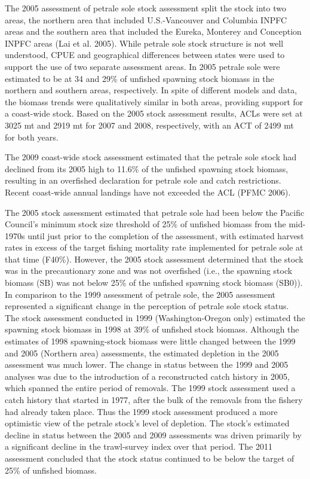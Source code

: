 \documentclass[12pt,]{article}
\begin{document}
The 2005 assessment of petrale sole stock assessment split the stock
into two areas, the northern area that included U.S.-Vancouver and
Columbia INPFC areas and the southern area that included the Eureka,
Monterey and Conception INPFC areas (Lai et al. 2005). While petrale
sole stock structure is not well understood, CPUE and geographical
differences between states were used to support the use of two separate
assessment areas. In 2005 petrale sole were estimated to be at 34 and
29\% of unfished spawning stock biomass in the northern and southern
areas, respectively. In spite of different models and data, the biomass
trends were qualitatively similar in both areas, providing support for a
coast-wide stock. Based on the 2005 stock assessment results, ACLs were
set at 3025 mt and 2919 mt for 2007 and 2008, respectively, with an ACT
of 2499 mt for both years.

The 2009 coast-wide stock assessment estimated that the petrale sole
stock had declined from its 2005 high to 11.6\% of the unfished spawning
stock biomass, resulting in an overfished declaration for petrale sole
and catch restrictions. Recent coast-wide annual landings have not
exceeded the ACL (PFMC 2006).

The 2005 stock assessment estimated that petrale sole had been below the
Pacific Council's minimum stock size threshold of 25\% of unfished
biomass from the mid-1970s until just prior to the completion of the
assessment, with estimated harvest rates in excess of the target fishing
mortality rate implemented for petrale sole at that time (F40\%).
However, the 2005 stock assessment determined that the stock was in the
precautionary zone and was not overfished (i.e., the spawning stock
biomass (SB) was not below 25\% of the unfished spawning stock biomass
(SB0)). In comparison to the 1999 assessment of petrale sole, the 2005
assessment represented a significant change in the perception of petrale
sole stock status. The stock assessment conducted in 1999
(Washington-Oregon only) estimated the spawning stock biomass in 1998 at
39\% of unfished stock biomass. Although the estimates of 1998
spawning-stock biomass were little changed between the 1999 and 2005
(Northern area) assessments, the estimated depletion in the 2005
assessment was much lower. The change in status between the 1999 and
2005 analyses was due to the introduction of a reconstructed catch
history in 2005, which spanned the entire period of removals. The 1999
stock assessment used a catch history that started in 1977, after the
bulk of the removals from the fishery had already taken place. Thus the
1999 stock assessment produced a more optimistic view of the petrale
stock's level of depletion. The stock's estimated decline in status
between the 2005 and 2009 assessments was driven primarily by a
significant decline in the trawl-survey index over that period. The 2011
assessment concluded that the stock status continued to be below the
target of 25\% of unfished biomass.
\end{document}
